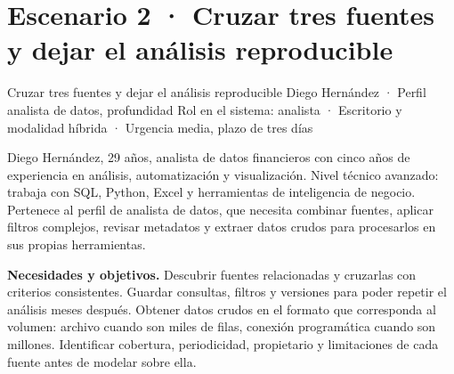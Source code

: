 
\begin{uxlist}
\end{uxlist}

\clearpage
\section{Escenario 2 · Cruzar tres fuentes y dejar el análisis reproducible}

  {Cruzar tres fuentes y dejar el análisis reproducible}
  {Diego Hernández · Perfil analista de datos, profundidad}
  {Rol en el sistema: analista · Escritorio y modalidad híbrida · Urgencia media, plazo de tres días}


Diego Hernández, 29 años, analista de datos financieros con cinco años de experiencia en
análisis, automatización y visualización. Nivel técnico avanzado: trabaja con SQL, Python,
Excel y herramientas de inteligencia de negocio. Pertenece al perfil de analista de datos, que
necesita combinar fuentes, aplicar filtros complejos, revisar metadatos y extraer datos crudos
para procesarlos en sus propias herramientas.

\textbf{\textcolor{uxnavy}{Necesidades y objetivos.}} Descubrir fuentes relacionadas y
cruzarlas con criterios consistentes. Guardar consultas, filtros y versiones para poder
repetir el análisis meses después. Obtener datos crudos en el formato que corresponda al
volumen: archivo cuando son miles de filas, conexión programática cuando son millones.
Identificar cobertura, periodicidad, propietario y limitaciones de cada fuente antes de
modelar sobre ella.

